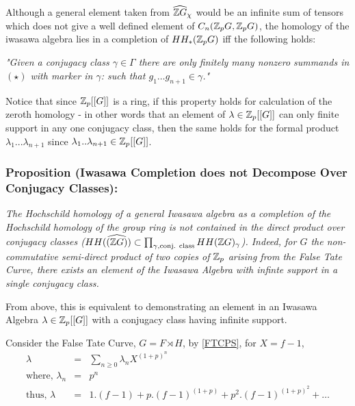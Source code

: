 Although a general element taken from $\widehat{\mathbb Z G}_\chi$ would be an infinite sum of tensors which does not give a well defined element of $C_n({\mathbb Z_p G},{\mathbb Z_p G})$, the homology of the iwasawa algebra lies in a completion of $HH_*(\mathbb Z_p G)$ iff the following holds:

\emph{"Given a conjugacy class $\gamma\in \Gamma$ there are only finitely many nonzero summands in $(\star)$ with marker in $\gamma$: such that $g_1\dots g_{n+1}\in \gamma$."}

Notice that since $\mathbb Z_p[[G]]$ is a ring, if this property holds for calculation of the zeroth homology - in other words that an element of $\lambda\in \mathbb Z_p[[G]]$ can only finite support in any one conjugacy class, then the same holds for the formal product $\lambda_1...\lambda_{n+1}$ since $\lambda_1..\lambda_{n+1}\in \mathbb Z_p[[G]]$.

\subsubsection{Proposition (Iwasawa Completion does not Decompose Over Conjugacy Classes):\label{no compose over conj}}
\emph{The Hochschild homology of a general Iwasawa algebra as a completion of the Hochschild homology of the group ring is not contained in the direct product over conjugacy classes ($ HH (        \widehat{(\mathbb Z G)}) \subset \prod_{\gamma , \text{conj. class}} HH (\mathbb Z G)_\gamma$). Indeed, for $G$ the non-commutative semi-direct product of two copies of $\mathbb Z_p$ arising from the False Tate Curve, there exists an element of the Iwasawa Algebra with infinte support in a single conjugacy class.}

\bigskip

From above, this is equivalent to demonstrating an element in an Iwasawa Algebra $\lambda\in \mathbb Z_p[[G]]$ with a conjugacy class having infinite support.

Consider the False Tate Curve, $G= F\rtimes H$, by \ref{FTCPS}, for $X=f-1$, 
\begin{eqnarray}
\nonumber \lambda &=& \sum_{n\geq 0} \lambda_n X^{{(1+p)}^n}\\
\nonumber \text{where, } \lambda_n &=& p^n\\
\nonumber \text{thus, } \lambda &=&  1.(f-1)+ p.(f-1)^{(1+p)}+p^2.(f-1)^{(1+p)^2}+\dots
\end{eqnarray}

